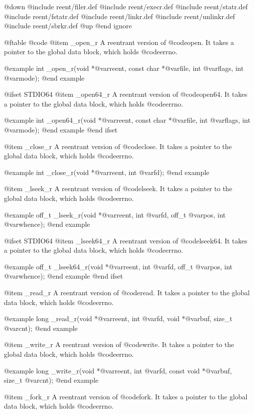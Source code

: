 @down
@include reent/filer.def
@include reent/execr.def
@include reent/statr.def
@include reent/fstatr.def
@include reent/linkr.def
@include reent/unlinkr.def
@include reent/sbrkr.def
@up
@end ignore

@ftable @code
@item _open_r
A reentrant version of @code{open}.  It takes a pointer
to the global data block, which holds @code{errno}.

@example
int _open_r(void *@var{reent},
    const char *@var{file}, int @var{flags}, int @var{mode});
@end example

@ifset STDIO64
@item _open64_r
A reentrant version of @code{open64}.  It takes a pointer
to the global data block, which holds @code{errno}.

@example
int _open64_r(void *@var{reent},
    const char *@var{file}, int @var{flags}, int @var{mode});
@end example
@end ifset

@item _close_r
A reentrant version of @code{close}.  It takes a pointer to the global
data block, which holds @code{errno}.

@example
int _close_r(void *@var{reent}, int @var{fd});
@end example

@item _lseek_r
A reentrant version of @code{lseek}.  It takes a pointer to the global
data block, which holds @code{errno}.

@example
off_t _lseek_r(void *@var{reent},
    int @var{fd}, off_t @var{pos}, int @var{whence});
@end example

@ifset STDIO64
@item _lseek64_r
A reentrant version of @code{lseek64}.  It takes a pointer to the global
data block, which holds @code{errno}.

@example
off_t _lseek64_r(void *@var{reent},
    int @var{fd}, off_t @var{pos}, int @var{whence});
@end example
@end ifset

@item _read_r
A reentrant version of @code{read}.  It takes a pointer to the global
data block, which holds @code{errno}.

@example
long _read_r(void *@var{reent},
    int @var{fd}, void *@var{buf}, size_t @var{cnt});
@end example

@item _write_r
A reentrant version of @code{write}.  It takes a pointer to the global
data block, which holds @code{errno}.

@example
long _write_r(void *@var{reent},
    int @var{fd}, const void *@var{buf}, size_t @var{cnt});
@end example

@item _fork_r
A reentrant version of @code{fork}.  It takes a pointer to the global
data block, which holds @code{errno}.

